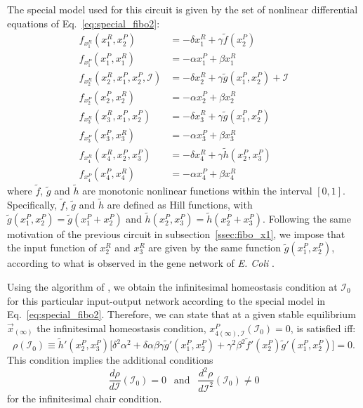 The special model \cite{stochs_gene_2005,homeostasis_antonelli2018} used for this circuit is given by the set 
of nonlinear differential equations of Eq.~\ref{eq:special_fibo2}:
\begin{equation} \label{eq:special_fibo2}
    \begin{aligned} 
        f_{x_1^R}(x_1^R, x_2^P) &= -\delta x_1^R + \gamma\tilde{f}(x_2^P) \\ 
        f_{x_1^P}(x_1^P, x_1^R) &= -\alpha x_1^P + \beta x_1^R \\ 
        f_{x_2^R}(x_2^R, x_1^P, x_2^P, \mathcal{I}) &= -\delta x_2^R + \gamma\tilde{g}(x_1^P, x_2^P) + \mathcal{I} \\ 
        f_{x_2^P}(x_2^P, x_2^R) &= -\alpha x_2^P + \beta x_2^R   \\ 
        f_{x_3^R}(x_3^R, x_1^P, x_2^P) &= -\delta x_3^R + \gamma \tilde{g}(x_1^P,x_2^P) \\ 
        f_{x_3^P}(x_3^P, x_3^R) &= -\alpha x_3^P + \beta x_3^R \\ 
        f_{x_4^R}(x_4^R, x_2^P, x_3^P) &= -\delta x_4^R + \gamma \tilde{h}(x_2^P, x_3^P) \\ 
        f_{x_4^P}(x_4^P, x_4^R) &= -\alpha x_4^P + \beta x_4^R
    \end{aligned}
\end{equation}
where $\tilde{f}$, $\tilde{g}$ and $\tilde{h}$ are monotonic nonlinear functions within the interval $[0,1]$. 
Specifically, $\tilde{f}$, $\tilde{g}$ and $\tilde{h}$ are defined as Hill functions,
with $\tilde{g}(x_1^P, x_2^P) = \tilde{g}(x_1^P + x_2^P)$ and $\tilde{h}(x_2^P, x_3^P) = \tilde{h}(x_2^P + x_3^P)$.
Following the same motivation of the previous circuit in subsection~\ref{ssec:fibo_x1}, we impose 
that the input function of $x_2^R$ and $x_3^R$ are given by the same function $\tilde{g}(x_1^P, x_2^P)$,
according to what is observed in the gene network of \textit{E. Coli} \cite{morone2020}.

Using the algorithm of \cite{wang2021}, we obtain the infinitesimal homeostasis condition at  
$\mathcal{I}_0$ for this particular input-output network according to the special model in 
Eq.~\ref{eq:special_fibo2}. Therefore, we can state that at a given stable equilibrium $\vec{x}_{(\infty)}$
the infinitesimal homeostasis condition, $x_{4(\infty), \mathcal{I}}^P(\mathcal{I}_0) = 0$, is satisfied iff:
\begin{equation} \label{eq:special_infhom_fibo2}
    \rho(\mathcal{I}_0) \equiv \tilde{h}'(x_2^P, x_3^P)\bigg[ \delta^2\alpha^2 + \delta\alpha\beta\gamma\tilde{g}'(x_1^P, x_2^P) + \gamma^2\beta^2\tilde{f}'(x_2^P)\tilde{g}'(x_1^P, x_2^P)\bigg] = 0.
\end{equation} 
This condition implies the additional conditions
\begin{equation}
    \frac{d\rho}{d\mathcal{I}}(\mathcal{I}_0) = 0 \ \ \text{ and } \ \ \frac{d^2\rho}{d\mathcal{I}^2}(\mathcal{I}_0) \neq 0
\end{equation}
for the infinitesimal chair condition.

